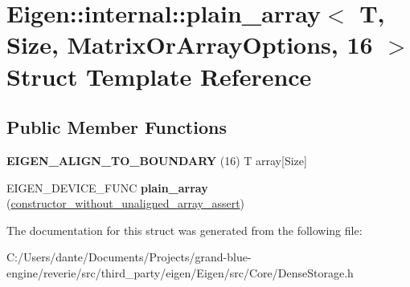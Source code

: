 \hypertarget{struct_eigen_1_1internal_1_1plain__array_3_01_t_00_01_size_00_01_matrix_or_array_options_00_0116_01_4}{}\section{Eigen\+::internal\+::plain\+\_\+array$<$ T, Size, Matrix\+Or\+Array\+Options, 16 $>$ Struct Template Reference}
\label{struct_eigen_1_1internal_1_1plain__array_3_01_t_00_01_size_00_01_matrix_or_array_options_00_0116_01_4}
\subsection*{Public Member Functions}
\begin{DoxyCompactItemize}
\item 
\mbox{\label{struct_eigen_1_1internal_1_1plain__array_3_01_t_00_01_size_00_01_matrix_or_array_options_00_0116_01_4_a0f68e88b4e3283699dfc1cc585ec13e7}} 
{\bfseries E\+I\+G\+E\+N\+\_\+\+A\+L\+I\+G\+N\+\_\+\+T\+O\+\_\+\+B\+O\+U\+N\+D\+A\+RY} (16) T array\mbox{[}Size\mbox{]}
\item 
\mbox{\label{struct_eigen_1_1internal_1_1plain__array_3_01_t_00_01_size_00_01_matrix_or_array_options_00_0116_01_4_adf7f104142768440f9c7f410e5859ae0}} 
E\+I\+G\+E\+N\+\_\+\+D\+E\+V\+I\+C\+E\+\_\+\+F\+U\+NC {\bfseries plain\+\_\+array} (\mbox{\hyperlink{struct_eigen_1_1internal_1_1constructor__without__unaligned__array__assert}{constructor\+\_\+without\+\_\+unaligned\+\_\+array\+\_\+assert}})
\end{DoxyCompactItemize}


The documentation for this struct was generated from the following file\+:\begin{DoxyCompactItemize}
\item 
C\+:/\+Users/dante/\+Documents/\+Projects/grand-\/blue-\/engine/reverie/src/third\+\_\+party/eigen/\+Eigen/src/\+Core/Dense\+Storage.\+h\end{DoxyCompactItemize}
